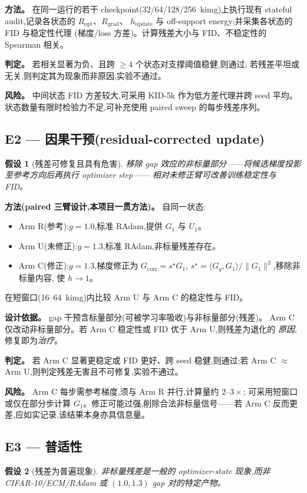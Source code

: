 \documentclass[UTF8,11pt,a4paper]{ctexart}
\newtheorem{hypothesis}{假设}[section]
\begin{document}
\textbf{方法。} 在同一运行的若干 checkpoint(32/64/128/256~kimg)上执行现有
stateful audit,记录各状态的 $R_{\mathrm{opt}}$、$R_{\mathrm{grad}}$、
$h_{\mathrm{update}}$ 与 off-support energy;并采集各状态的 FID 与稳定性代理
(梯度/loss 方差)。计算残差大小与 FID、不稳定性的 Spearman 相关。

\textbf{判定。} 若相关显著为负、且跨 $\geq4$ 个状态对支撑阈值稳健,则通过;
若残差平坦或无关,则判定其为现象而非原因,实验不通过。

\textbf{风险。} 中间状态 FID 方差较大,可采用 KID-5k 作为低方差代理并跨 seed
平均。状态数量有限时检验力不足,可补充使用 paired sweep 的每步残差序列。

\subsection{E2 --- 因果干预(residual-corrected update)}
\begin{hypothesis}[残差可修复且具有危害]
\label{hyp:E2}
移除 gap 效应的非标量部分——将候选梯度投影至参考方向后再执行 optimizer step——
相对未修正臂可改善训练稳定性与 FID。
\end{hypothesis}

\textbf{方法(paired 三臂设计,本项目一贯方法)。} 自同一状态:
\begin{itemize}
  \item Arm R(参考):$g=1.0$,标准 RAdam,提供 $G_1$ 与 $U_1$。
  \item Arm U(未修正):$g=1.3$,标准 RAdam,非标量残差存在。
  \item Arm C(修正):$g=1.3$,梯度修正为 $G_{\mathrm{corr}} = s^\star G_1$,
        $s^\star = \langle G_g,G_1\rangle/\lVert G_1\rVert^2$,移除非标量内容,
        使 $h\to 1$。
\end{itemize}
在短窗口(16--64~kimg)内比较 Arm U 与 Arm C 的稳定性与 FID。

\textbf{设计依据。} gap 干预含标量部分(可被学习率吸收)与非标量部分(残差)。
Arm C 仅改动非标量部分。若 Arm C 稳定性或 FID 优于 Arm U,则残差为退化的
\emph{原因},修复即为\emph{治疗}。

\textbf{判定。} 若 Arm C 显著更稳定或 FID 更好、跨 seed 稳健,则通过;若
Arm C $\approx$ Arm U,则判定残差无害且不可修复,实验不通过。

\textbf{风险。} Arm C 每步需参考梯度,须与 Arm R 并行,计算量约 $2$--$3\times$;
可采用短窗口或仅在部分步计算 $G_1$。修正可能过强,削除合法非标量信号——若
Arm C 反而更差,应如实记录,该结果本身亦具信息量。

\subsection{E3 --- 普适性}
\begin{hypothesis}[残差为普遍现象]
\label{hyp:E3}
非标量残差是一般的 optimizer-state 现象,而非 CIFAR-10/ECM/RAdam 或
$(1.0,1.3)$ gap 对的特定产物。
\end{hypothesis}
\end{document}
